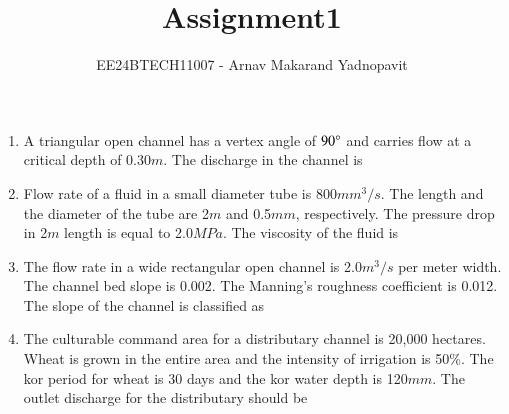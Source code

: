 \documentclass[journal,12pt,onecolumn]{IEEEtran}
\theoremstyle{remark}
\begin{document}
\title{Assignment1}
\author{EE24BTECH11007 - Arnav Makarand Yadnopavit}
\maketitle
\renewcommand{\thefigure}{\theenumi}
\renewcommand{\thetable}{\theenumi}
\begin{enumerate}
\item A triangular open channel has a vertex angle of $90\degree$ and carries flow at a critical depth of 0.30$m$. The discharge in the channel is
\begin{enumerate}
\end{enumerate}
\item Flow rate of a fluid  in a small diameter tube is 800$mm^3/s$. The length and the diameter of the tube are 2$m$ and 0.5$mm$, respectively. The pressure drop in 2$m$ length is equal to 2.0$MPa$. The viscosity of the fluid is 
\begin{enumerate}
\end{enumerate}
\item The flow rate in a wide rectangular open channel is 2.0$m^3/s$ per meter width. The channel bed slope is 0.002. The Manning's roughness coefficient is 0.012. The slope of the channel is classified as
\begin{enumerate}
\end{enumerate}
\item The culturable command area for a distributary channel is 20,000 hectares. Wheat is grown in the entire area and the intensity of irrigation is 50\%. The kor period for wheat is 30 days and the kor water depth is 120$mm$. The outlet discharge for the distributary should be

\end{enumerate}
\end{document}
